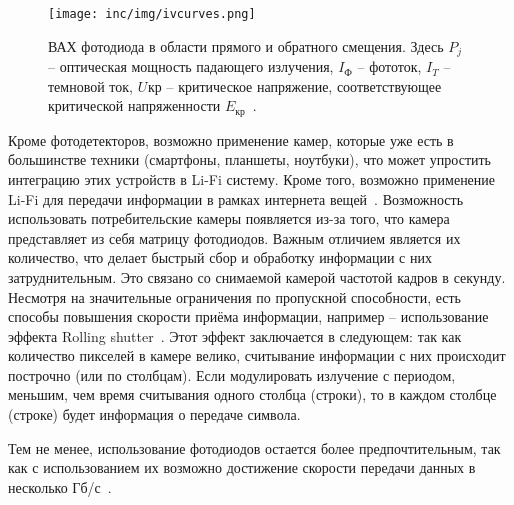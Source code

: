 \begin{figure}[!ht]
    \centering
    \texttt{[image: inc/img/ivcurves.png]}
    \caption{ВАХ фотодиода в области прямого и обратного смещения. Здесь $P_{j}$ \--- оптическая мощность падающего излучения, $I_Ф$ \--- фототок, $I_T$ \--- темновой ток, $U_{}кр$ \--- критическое напряжение, соответствующее критической напряженности $E_{кр}$~\cite{Noikin2011}.}
    \label{fig:ivcurves}
\end{figure}


Кроме фотодетекторов, возможно применение камер, которые уже есть в большинстве техники (смартфоны, планшеты, ноутбуки), что может упростить интеграцию этих устройств в Li-Fi систему. Кроме того, возможно применение Li-Fi для передачи информации в рамках интернета вещей~\cite{Duquel2018}. Возможность использовать потребительские камеры появляется из-за того, что камера представляет из себя матрицу фотодиодов. Важным отличием является их количество, что делает быстрый сбор и обработку информации с них затруднительным. Это связано со снимаемой камерой частотой кадров в секунду. Несмотря на значительные ограничения по пропускной способности, есть способы повышения скорости приёма информации, например \--- использование эффекта Rolling shutter~\cite{TRAN2018}. Этот эффект заключается в следующем: так как количество пикселей в камере велико, считывание информации с них происходит построчно (или по столбцам). Если модулировать излучение с периодом, меньшим, чем время считывания одного столбца (строки), то в каждом столбце (строке) будет информация о передаче символа.

Тем не менее, использование фотодиодов остается более предпочтительным, так как с использованием их возможно достижение скорости передачи данных в несколько Гб/с~\cite{Cossu2012}.


